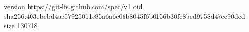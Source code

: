 version https://git-lfs.github.com/spec/v1
oid sha256:403ebcbd4ae57925011c85a6a6c06b8045f6b0156b30fc8bed9758d47ee90dcd
size 130718
